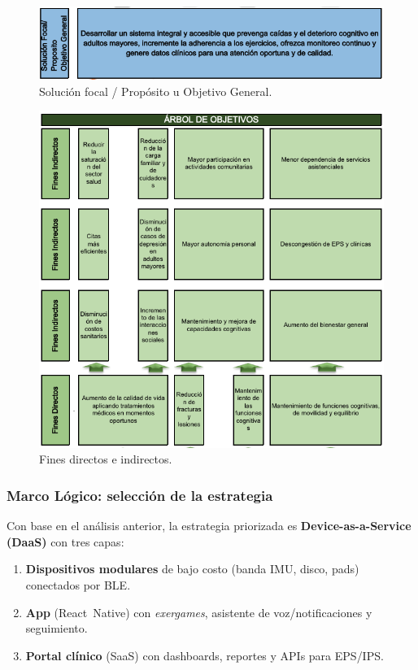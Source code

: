 \begin{figure}[H]\centering
\includegraphics[width=.95\linewidth]{Figures/Arbol_Objetivos/02_solucion_focal_proposito.png}
\caption{Solución focal / Propósito u Objetivo General.}
\end{figure}

\begin{figure}[H]\centering
\includegraphics[width=.95\linewidth]{Figures/Arbol_Objetivos/03_fines_directos_indirectos.png}
\caption{Fines directos e indirectos.}
\end{figure}

\subsubsection{Marco Lógico: selección de la estrategia}
Con base en el análisis anterior, la estrategia priorizada es \textbf{Device-as-a-Service (DaaS)} con tres capas:
\begin{enumerate}
    \item \textbf{Dispositivos modulares} de bajo costo (banda IMU, disco, pads) conectados por BLE.
    \item \textbf{App} (React~Native) con \emph{exergames}, asistente de voz/notificaciones y seguimiento.
    \item \textbf{Portal clínico} (SaaS) con dashboards, reportes y APIs para EPS/IPS.
\end{enumerate}

